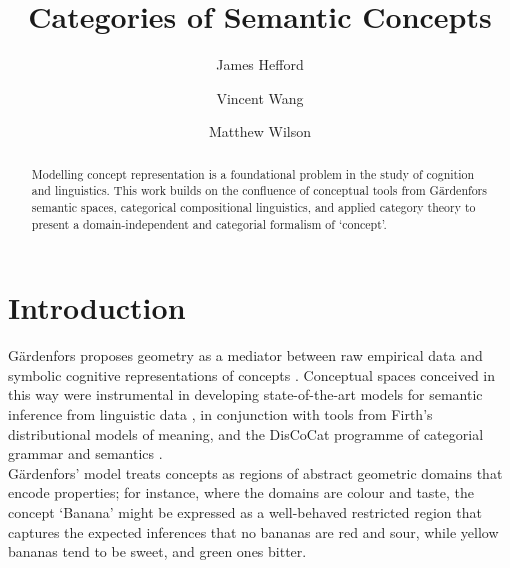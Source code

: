 \documentclass[11pt]{article}
\title{Categories of Semantic Concepts}
\author[1]{James Hefford}
\author[1]{Vincent Wang}
\author[1,2]{Matthew Wilson}
\affil[1]{University of Oxford, Department of Computer Science, Quantum Group}
\affil[2]{HKU-Oxford Joint Laboratory for Quantum Information and Computation}
\theoremstyle{definition}
\theoremstyle{plain}
\begin{document}
\maketitle

\begin{abstract}
    Modelling concept representation is a foundational problem in the study of cognition and linguistics. This work builds on the confluence of conceptual tools from G\"{a}rdenfors semantic spaces, categorical compositional linguistics, and applied category theory to present a domain-independent and categorial formalism of `concept'.
\end{abstract}

\section{Introduction}

G\"{a}rdenfors proposes geometry as a mediator between raw empirical data and symbolic cognitive representations of concepts \cite{gardenfors_conceptual_2004}. Conceptual spaces conceived in this way were instrumental in developing state-of-the-art models for semantic inference from linguistic data \cite{bolt_interacting_2017}, in conjunction with tools from Firth's distributional models of meaning, and the DisCoCat programme of categorial grammar and semantics \cite{coecke_mathematical_2010}.\\

G\"{a}rdenfors' model treats concepts as regions of abstract geometric domains that encode properties; for instance, where the domains are colour and taste, the concept `Banana' might be expressed as a well-behaved restricted region that captures the expected inferences that no bananas are red and sour, while yellow bananas tend to be sweet, and green ones bitter.\\
\end{document}
